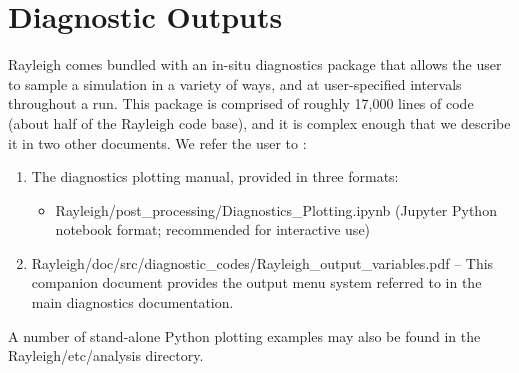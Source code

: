 \section{Diagnostic Outputs}\label{sec:diagnostics}

Rayleigh comes bundled with an in-situ diagnostics package that allows the user to sample a simulation in a variety of ways, and at user-specified intervals throughout a run.  This package is comprised of roughly 17,000 lines of code (about half of the Rayleigh code base), and it is complex enough that we describe it in two other documents.  We refer the user to :
\begin{enumerate}
\item The diagnostics plotting manual, provided in three formats:
    \begin{itemize}
    \item Rayleigh/post\_processing/Diagnostics\_Plotting.ipynb (Jupyter Python notebook format; recommended for interactive use)
    \end{itemize}
\item Rayleigh/doc/src/diagnostic\_codes/Rayleigh\_output\_variables.pdf --  This companion document provides the output menu system referred to in the main diagnostics documentation.
\end{enumerate}

A number of stand-alone Python plotting examples may also be found in the Rayleigh/etc/analysis directory.
